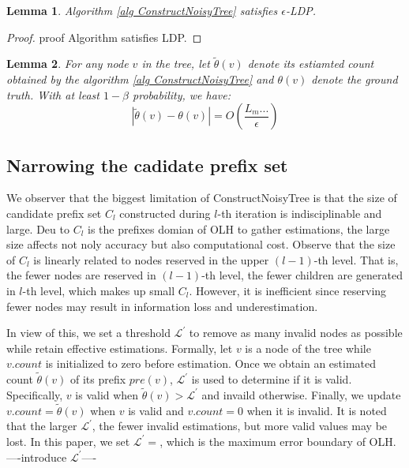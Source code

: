\documentclass[conference]{IEEEtran}
\begin{document}


\newtheorem{lemma}{Lemma}[section]
\begin{lemma}
Algorithm \ref{alg ConstructNoisyTree} satisfies $\epsilon$-LDP.
\end{lemma}

\begin{proof}
proof Algorithm satisfies LDP.
\end{proof}

\begin{lemma}
For any node $v$ in the tree, let $\tilde{\theta}(v)$ denote its estiamted count obtained by the algorithm \ref{alg ConstructNoisyTree} and $\theta (v)$ denote the ground truth. With at least $1-\beta$ probability, we have:
$$|\tilde{\theta}(v) - \theta(v) | = O \left(\frac{L_m...}{\epsilon} \right)$$
\end{lemma}

\subsection{Narrowing the cadidate prefix set}
\label{nc}
We observer that the biggest limitation of ConstructNoisyTree is that the size of candidate prefix set $C_l$ constructed during $l$-th iteration is indisciplinable and large. Deu to $C_l$ is the prefixes domian of OLH to gather estimations, the large size affects not noly accuracy but also computational cost. Observe that the size of $C_l$ is linearly related to nodes reserved in the upper $(l-1)$-th level. That is, the fewer nodes are reserved in $(l-1)$-th level, the fewer children are generated in $l$-th level, which makes up small $C_l$. However, it is inefficient since reserving fewer nodes may result in information loss and underestimation.  

In view of this, {\color{red}we set a threshold $\mathcal{L}^{\prime}$ to remove as many invalid nodes as possible while retain effective estimations. Formally, let $v$ is a node of the tree while $v.count$ is initialized to zero before estimation. Once we obtain an estimated count $\tilde{\theta}(v)$ of its prefix $pre(v)$, $\mathcal{L}^{\prime}$ is used to determine if it is valid. Specifically, $v$ is valid when $\tilde{\theta}(v) > \mathcal{L}^{\prime}$ and invaild otherwise. Finally, we update $v.count=\tilde{\theta}(v)$ when $v$ is valid and $v.count=0$ when it is invalid. It is noted that the larger $\mathcal{L}^{\prime}$, the fewer invalid estimations, but more valid values may be lost. In this paper, we set $\mathcal{L}^{\prime} = $, which is the maximum error boundary of OLH.\\
----introduce $\mathcal{L}^{\prime}$----}
\end{document}
